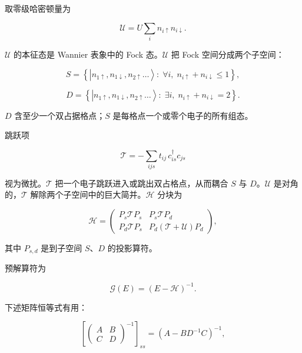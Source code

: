 取零级哈密顿量为

\begin{equation*}
\mathcal {U} = U \sum_ {i} n _ {i \uparrow} n _ {i \downarrow}.
\tag{3.15}
\end{equation*}

$\mathcal{U}$ 的本征态是 Wannier 表象中的 Fock 态。$\mathcal{U}$ 把 Fock 空间分成两个子空间：

\begin{equation*}
S = \left\{ \left| n _ {1 \uparrow}, n _ {1 \downarrow}, n _ {2 \uparrow} \dots \right\rangle : \; \forall i, \; n _ {i \uparrow} + n _ {i \downarrow} \leq 1 \right\},
\tag{3.16}
\end{equation*}

\begin{equation*}
D = \left\{ \left| n _ {1 \uparrow}, n _ {1 \downarrow}, n _ {2 \uparrow} \dots \right\rangle : \; \exists i, \; n _ {i \uparrow} + n _ {i \downarrow} = 2 \right\}.
\tag{3.17}
\end{equation*}

$D$ 含至少一个双占据格点；$S$ 是每格点一个或零个电子的所有组态。

跳跃项

\begin{equation*}
\mathcal {T} = - \sum_ {ijs} t _ {ij} \, c _ {is} ^ {\dagger} c _ {js}
\tag{3.18}
\end{equation*}

视为微扰。$\mathcal{T}$ 把一个电子跳跃进入或跳出双占格点，从而耦合 $S$ 与 $D$。$\mathcal{U}$ 是对角的，$\mathcal{T}$ 解除两个子空间中的巨大简并。$\mathcal{H}$ 分块为

\begin{equation*}
\mathcal {H} = \left( \begin{array}{cc} P _ {s} \mathcal {T} P _ {s} & P _ {s} \mathcal {T} P _ {d} \\ P _ {d} \mathcal {T} P _ {s} & P _ {d} ( \mathcal {T} + \mathcal {U} ) P _ {d} \end{array} \right),
\tag{3.19}
\end{equation*}

其中 $P_{s,d}$ 是到子空间 $S$、$D$ 的投影算符。

预解算符为

\begin{equation*}
\mathcal {G} (E) = (E - \mathcal {H}) ^ {- 1}.
\tag{3.20}
\end{equation*}

下述矩阵恒等式有用：

\begin{equation*}
\left[ \left( \begin{array}{cc} A & B \\ C & D \end{array} \right) ^ {- 1} \right] _ {ss} = (A - B D ^ {- 1} C) ^ {- 1},
\tag{3.21}
\end{equation*}

